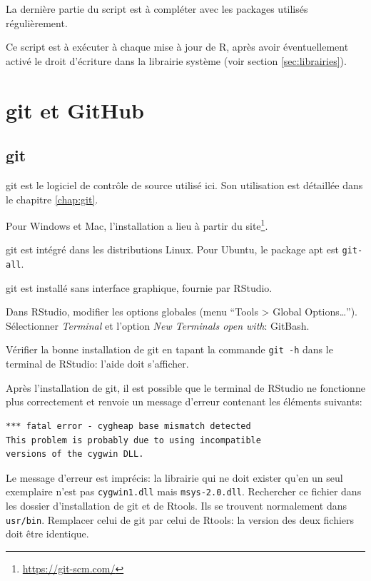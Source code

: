 \documentclass[
  12pt,
  french,
  a4paper,
  extrafontsizes,onecolumn,openright
  ]{memoir}
\newlength{\rf}
\begin{document}
\normalsize

La dernière partie du script est à compléter avec les packages utilisés régulièrement.

Ce script est à exécuter à chaque mise à jour de R, après avoir éventuellement activé le droit d'écriture dans la librairie système (voir section \ref{sec:librairies}).

\hypertarget{git-et-github}{%
\section{git et GitHub}\label{git-et-github}}

\hypertarget{git}{%
\subsection{git}\label{git}}

git est le logiciel de contrôle de source utilisé ici.
Son utilisation est détaillée dans le chapitre \ref{chap:git}.

Pour Windows et Mac, l'installation a lieu à partir du site\footnote{\url{https://git-scm.com/}}.

git est intégré dans les distributions Linux.
Pour Ubuntu, le package apt est \texttt{git-all}.

git est installé sans interface graphique, fournie par RStudio.

Dans RStudio, modifier les options globales (menu \enquote{Tools \textgreater{} Global Options\ldots{}}).
Sélectionner \emph{Terminal} et l'option \emph{New Terminals open with}: GitBash.

Vérifier la bonne installation de git en tapant la commande \texttt{git\ -h} dans le terminal de RStudio: l'aide doit s'afficher.

Après l'installation de git, il est possible que le terminal de RStudio ne fonctionne plus correctement et renvoie un message d'erreur contenant les éléments suivants:

\begin{verbatim}
*** fatal error - cygheap base mismatch detected
This problem is probably due to using incompatible 
versions of the cygwin DLL.
\end{verbatim}

Le message d'erreur est imprécis: la librairie qui ne doit exister qu'en un seul exemplaire n'est pas \texttt{cygwin1.dll} mais \texttt{msys-2.0.dll}.
Rechercher ce fichier dans les dossier d'installation de git et de Rtools.
Ils se trouvent normalement dans \texttt{usr/bin}.
Remplacer celui de git par celui de Rtools: la version des deux fichiers doit être identique.
\end{document}
